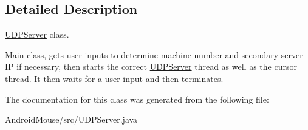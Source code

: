 \subsection{Detailed Description}
\hyperlink{class_u_d_p_server}{U\+D\+P\+Server} class. 

Main class, gets user inputs to determine machine number and secondary server IP if necessary, then starts the correct \hyperlink{class_u_d_p_server}{U\+D\+P\+Server} thread as well as the cursor thread. It then waits for a user input and then terminates. 

The documentation for this class was generated from the following file\+:\begin{DoxyCompactItemize}
\item 
Android\+Mouse/src/U\+D\+P\+Server.\+java\end{DoxyCompactItemize}
